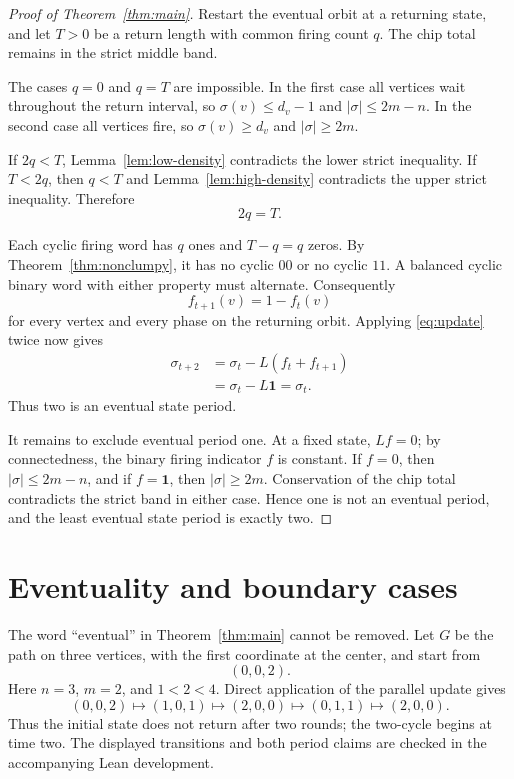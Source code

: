 \documentclass[11pt]{article}
\theoremstyle{definition}
\theoremstyle{remark}
\newcommand{\one}{\mathbf{1}}
\newcommand{\chips}[1]{\lvert #1\rvert}
\begin{document}
\begin{proof}[Proof of Theorem~\ref{thm:main}]
Restart the eventual orbit at a returning state, and let $T>0$ be a return
length with common firing count $q$. The chip total remains in the strict
middle band.

The cases $q=0$ and $q=T$ are impossible. In the first case all vertices wait
throughout the return interval, so $\sigma(v)\le d_v-1$ and
$\chips{\sigma}\le 2m-n$. In the second case all vertices fire, so
$\sigma(v)\ge d_v$ and $\chips{\sigma}\ge 2m$.

If $2q<T$, Lemma~\ref{lem:low-density} contradicts the lower strict
inequality. If $T<2q$, then $q<T$ and Lemma~\ref{lem:high-density} contradicts
the upper strict inequality. Therefore
\begin{equation}\label{eq:half-activity}
   2q=T.
\end{equation}

Each cyclic firing word has $q$ ones and $T-q=q$ zeros. By
Theorem~\ref{thm:nonclumpy}, it has no cyclic $00$ or no cyclic $11$. A
balanced cyclic binary word with either property must alternate. Consequently
\[
   f_{t+1}(v)=1-f_t(v)
\]
for every vertex and every phase on the returning orbit. Applying
\eqref{eq:update} twice now gives
\[
\begin{aligned}
   \sigma_{t+2}
   &=\sigma_t-L(f_t+f_{t+1})\\
   &=\sigma_t-L\one
    =\sigma_t.
\end{aligned}
\]
Thus two is an eventual state period.

It remains to exclude eventual period one. At a fixed state, $Lf=0$; by
connectedness, the binary firing indicator $f$ is constant. If $f=0$, then
$\chips{\sigma}\le 2m-n$, and if $f=\one$, then
$\chips{\sigma}\ge 2m$. Conservation of the chip total contradicts the
strict band in either case. Hence one is not an eventual period, and the least
eventual state period is exactly two.
\end{proof}

\section{Eventuality and boundary cases}

The word ``eventual'' in Theorem~\ref{thm:main} cannot be removed. Let $G$ be
the path on three vertices, with the first coordinate at the center, and start
from
\[
   (0,0,2).
\]
Here $n=3$, $m=2$, and $1<2<4$. Direct application of the parallel update
gives
\[
 (0,0,2)\longmapsto(1,0,1)\longmapsto(2,0,0)
 \longmapsto(0,1,1)\longmapsto(2,0,0).
\]
Thus the initial state does not return after two rounds; the two-cycle begins
at time two. The displayed transitions and both period claims are checked in
the accompanying Lean development.
\end{document}
